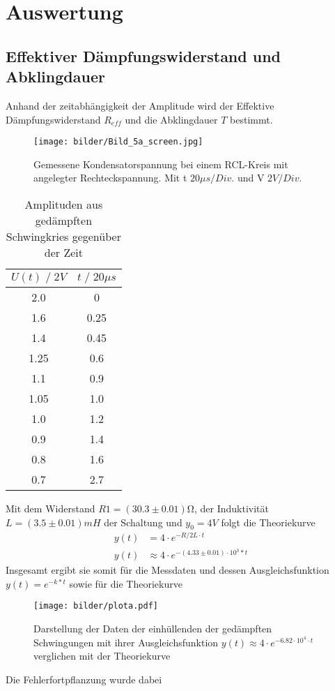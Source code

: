 \newpage
\section{Auswertung}
\subsection{Effektiver Dämpfungswiderstand und Abklingdauer}
Anhand der zeitabhängigkeit der Amplitude wird der Effektive Dämpfungswiderstand $R_{eff}$
und die Abklingdauer $T$ bestimmt. 
\begin{figure}
    \centering
    \texttt{[image: bilder/Bild\_5a\_screen.jpg]}
    \caption{
        Gemessene Kondensatorspannung bei einem RCL-Kreis mit angelegter Rechteckspannung. 
        Mit t $20\mu s/Div.$ und V $ 2V/Div.$
        }
    \label{fig:bild1}
\end{figure}

\begin{table}
    \centering
    \begin{tabular}{c c}
        \toprule
        $U(t)\;/\;2V$ & $t\;/\;20\mu s$\\
        \midrule
        2.0     &0   \\
        1.6     &0.25\\
        1.4     &0.45\\
        1.25    &0.6\\
        1.1     &0.9\\
        1.05    &1.0\\
        1.0     &1.2\\
        0.9     &1.4\\
        0.8     &1.6\\
        0.7     &2.7\\
        \bottomrule
    \end{tabular}
    \caption{Amplituden aus gedämpften Schwingkries gegenüber der Zeit}
    \label{tab:tabelle1}
\end{table}

Mit dem Widerstand $R1=(30.3\pm0.01)\si{\ohm}$, der Induktivität $L=(3.5 \pm 0.01)mH$ der Schaltung und $y_0=4V$ folgt die Theoriekurve
\begin{align}
    y(t)&=4 \cdot e^{-R/2L \cdot t}\\
    y(t)&\approx 4 \cdot e^{-(4.33\pm0.01) \cdot 10^3*t}
\end{align}
\newpage
Insgesamt ergibt sie somit für die Messdaten und dessen Ausgleichsfunktion $y(t)=e^{-k*t}$
sowie für die Theoriekurve
\begin{figure}
    \centering
    \texttt{[image: bilder/plota.pdf]}
    \caption{
        Darstellung der Daten der einhüllenden der gedämpften Schwingungen mit ihrer
        Ausgleichsfunktion $y(t)\approx 4 \cdot e^{-6.82\cdot10^4 \cdot t}$ verglichen mit der Theoriekurve
    }
    \label{fig:ultra_plot}
\end{figure}
Die Fehlerfortpflanzung wurde dabei 




